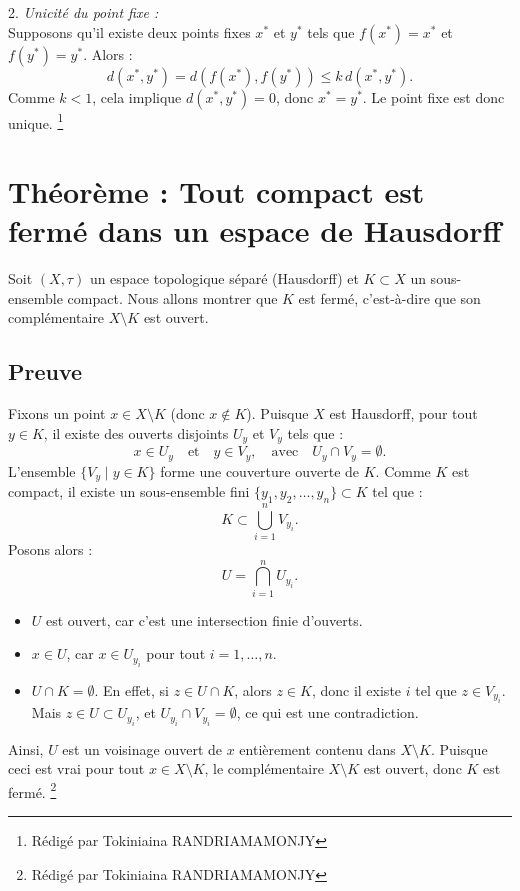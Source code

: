 \documentclass[12pt]{book}
\begin{document}
2. \textit{Unicité du point fixe :} \\
Supposons qu'il existe deux points fixes $x^*$ et $y^*$ tels que $f(x^*) = x^*$ et $f(y^*) = y^*$. Alors :
\[
d(x^*, y^*) = d(f(x^*), f(y^*)) \leq k \, d(x^*, y^*).
\]
Comme $k < 1$, cela implique $d(x^*, y^*) = 0$, donc $x^* = y^*$. Le point fixe est donc unique.
\clearpage
\footnote{R\'edig\'e par Tokiniaina RANDRIAMAMONJY}
\section {Théorème : Tout compact est fermé dans un espace de Hausdorff} Soit \( (X, \tau) \) un espace topologique séparé (Hausdorff) et \( K \subset X \) un sous-ensemble compact. Nous allons montrer que \( K \) est fermé, c'est-à-dire que son complémentaire \( X \setminus K \) est ouvert. \subsection*{Preuve} Fixons un point \( x \in X \setminus K \) (donc \( x \notin K \)). Puisque \( X \) est Hausdorff, pour tout \( y \in K \), il existe des ouverts disjoints \( U_y \) et \( V_y \) tels que : \[ x \in U_y \quad \text{et} \quad y \in V_y, \quad \text{avec} \quad U_y \cap V_y = \emptyset. \] L'ensemble \( \{ V_y \mid y \in K \} \) forme une couverture ouverte de \( K \). Comme \( K \) est compact, il existe un sous-ensemble fini \( \{ y_1, y_2, \dots, y_n \} \subset K \) tel que : \[ K \subset \bigcup_{i=1}^n V_{y_i}. \] Posons alors : \[ U = \bigcap_{i=1}^n U_{y_i}. \] \begin{itemize} \item \( U \) est ouvert, car c'est une intersection finie d'ouverts. \item \( x \in U \), car \( x \in U_{y_i} \) pour tout \( i = 1, \dots, n \). \item \( U \cap K = \emptyset \). En effet, si \( z \in U \cap K \), alors \( z \in K \), donc il existe \( i \) tel que \( z \in V_{y_i} \). Mais \( z \in U \subset U_{y_i} \), et \( U_{y_i} \cap V_{y_i} = \emptyset \), ce qui est une contradiction. \end{itemize} Ainsi, \( U \) est un voisinage ouvert de \( x \) entièrement contenu dans \( X \setminus K \). Puisque ceci est vrai pour tout \( x \in X \setminus K \), le complémentaire \( X \setminus K \) est ouvert, donc \( K \) est fermé.
\clearpage
\footnote{R\'edig\'e par Tokiniaina RANDRIAMAMONJY}
\end{document}
